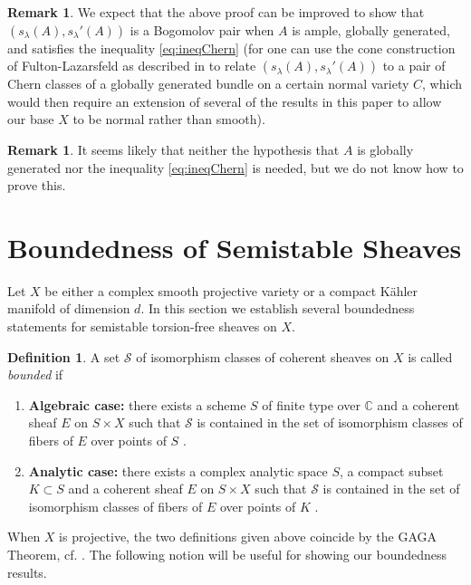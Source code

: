 \documentclass[a4,reqno]{amsart}
\theoremstyle{definition}
\newtheorem{definition}[theorem]{Definition}
\newtheorem{remark}[theorem]{Remark}
\def\cS{\mathcal S }
\newcommand{\C}{\mathbb{C}}
\numberwithin{equation}{section}
\begin{document}
\begin{remark}
We expect that the above proof can be improved to show that $(s_{\lambda}(A),s_{\lambda}'(A))$ is a Bogomolov pair when $A$ is ample, globally generated, and satisfies the inequality \eqref{eq:ineqChern} (for one can use the cone construction of Fulton-Lazarsfeld as described in \cite{RossToma1} to relate $(s_{\lambda}(A),s_{\lambda}'(A))$ to a pair of Chern classes of a globally generated bundle on a certain normal variety $C$, which would then require an extension of several of the results in this paper to allow our base $X$ to be normal rather than smooth).
\end{remark}
\begin{remark}
It seems likely that neither the hypothesis that $A$ is globally generated nor the inequality \eqref{eq:ineqChern} is needed, but we do not know how to prove this.
\end{remark}



\section{Boundedness of Semistable Sheaves}

Let $X$ be either a complex smooth projective variety or a compact K\"ahler manifold of dimension $d$. In this section we establish several boundedness statements for semistable torsion-free sheaves on $X$.

\begin{definition}\label{def:boundedFam}
A set $\cS$ of isomorphism classes of coherent sheaves on $X$ is called \textit{bounded} if 
\begin{enumerate}
    \item \textbf{Algebraic case:} there exists a scheme $S$ of finite type over $\C$ and  a coherent sheaf $E$ on $S \times X$ such that $\cS$ is contained in the set of isomorphism classes of fibers of $E$ over points of $S$ \cite[Definition 1.7.5]{HL}.
    \item \textbf{Analytic case:} there exists a complex analytic space $S$, a compact subset $K \subset S$ and a coherent sheaf $E$ on $S \times X$ such that $\cS$ is contained in the set of isomorphism classes of fibers of $E$ over points of $K$ \cite[Definition 5.1]{TomaLimitareaII}.
\end{enumerate}
\end{definition}

When $X$ is projective, the two definitions given above coincide by the GAGA Theorem, cf. \cite[Remark 3.3]{TomaLimitareaI}. The following notion will be useful for showing our boundedness results.
\end{document}

